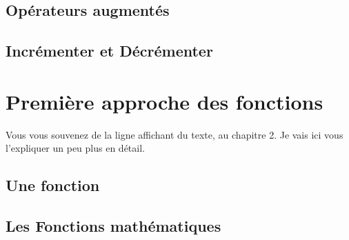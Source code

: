 \subsection{Opérateurs augmentés}
\subsection{Incrémenter et Décrémenter}

\section{Première approche des fonctions}
Vous vous souvenez de la ligne affichant du texte, au chapitre 2. Je vais ici vous l'expliquer un peu plus en détail. %
\subsection{Une fonction}

\subsection{Les Fonctions mathématiques}

